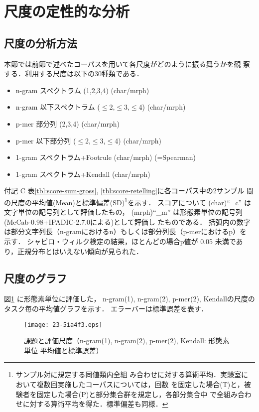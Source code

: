 \documentclass[japanese]{jnlp_1.4}
\begin{document}
\section{尺度の定性的な分析}

\subsection{尺度の分析方法}

本節では前節で述べたコーパスを用いて各尺度がどのように振る舞うかを観
察する．利用する尺度は以下の30種類である．

\begin{itemize}
 \item n-gram スペクトラム (1,2,3,4) (char/mrph)
 \item n-gram 以下スペクトラム ($\leq$2,$\leq$3,$\leq$4) (char/mrph)       
 \item p-mer 部分列 (2,3,4) (char/mrph)
 \item p-mer 以下部分列 ($\leq$2,$\leq$3,$\leq$4) (char/mrph)  
 \item 1-gram スペクトラム+Footrule (char/mrph) (=Spearman)
 \item 1-gram スペクトラム+Kendall (char/mrph)
 \end{itemize}

 付記 C 表\ref{tbl:score-sum-gross}, \ref{tbl:score-retelling}に各コーパス中の2サンプル
 間の尺度の平均値(Mean)と標準偏差(SD)\footnote{サンプル対に規定する同値類内全組
 み合わせに対する算術平均．実験室において複数回実施したコーパスについては，回数
 を固定した場合(T)と，被験者を固定した場合(P)と部分集合群を規定し，各部分集合中
 で全組み合わせに対する算術平均を得た．標準偏差も同様．}を示す．
 スコアについて (char)``\_c'' は文字単位の記号列として評価したもの，
 (mrph)``\_m'' は形態素単位の記号列(MeCab-0.98+IPADIC-2.7.0による)として評価し
 たものである．
括弧内の数字は部分文字列長（n-gramにおけるn）もしくは部分列長（p-merにおけるp）を
 示す．
シャピロ・ウィルク検定の結果，ほとんどの場合p値が 0.05 未満であり，正規分布とはいえない傾向が見られた．


\subsection{尺度のグラフ}

図\ref{fig:score-task-graph} に形態素単位に評価した，
n-gram(1), n-gram(2), p-mer(2), Kendallの尺度のタスク毎の平均値グラフを示す．
エラーバーは標準誤差を表す．

\begin{figure}[b]
\begin{center}
\texttt{[image: 23-5ia4f3.eps]}
\end{center}
\caption{課題と評価尺度（n-gram(1), n-gram(2), p-mer(2), Kendall: 形態素単位 平均値と標準誤差）} 
\label{fig:score-task-graph}
\end{figure}
\end{document}
